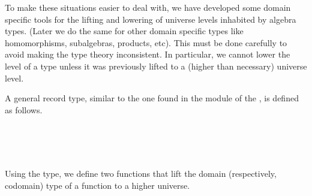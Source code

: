 To make these situations easier to deal with, we have developed some domain specific tools for the lifting and lowering of universe levels inhabited by algebra types. (Later we do the same for other domain specific types like homomorphisms, subalgebras, products, etc). This must be done carefully to avoid making the type theory inconsistent. In particular, we cannot lower the level of a type unless it was previously lifted to a (higher than necessary) universe level.

A general  record type, similar to the one found in the  module of the \agdastdlib, is defined as follows.
\ccpad
\begin{code}%
\>[0]\AgdaSpace{}%
\AgdaSpace{}%
\AgdaSymbol{\{}\AgdaSpace{}%
\AgdaSpace{}%
\AgdaSymbol{:}\AgdaSpace{}%
\AgdaSymbol{\}}\AgdaSpace{}%
\AgdaSymbol{(}\AgdaSpace{}%
\AgdaSymbol{:}\AgdaSpace{}%
\AgdaSpace{}%
\AgdaSymbol{)}\AgdaSpace{}%
\AgdaSymbol{:}\AgdaSpace{}%
\AgdaSpace{}%
\AgdaSpace{}%
\AgdaSpace{}%
%
\>[50]\<%
\\
\>[0][@{}l@{\AgdaIndent{0}}]%
\>[1]\AgdaSpace{}%
\<%
\\
%
\>[1]\AgdaSpace{}%
\AgdaSpace{}%
\AgdaSymbol{:}\AgdaSpace{}%
\<%
\\
\>[0]\AgdaSpace{}%
\<%
\end{code}
\ccpad
Using the  type, we define two functions that lift the domain (respectively, codomain) type of a function to a higher universe.
\ccpad
